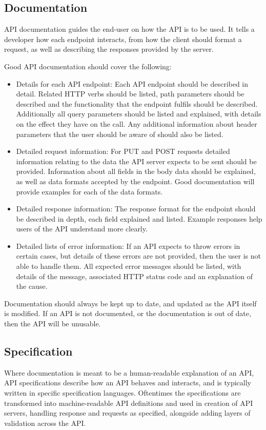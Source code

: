 \subsection{Documentation}
API documentation guides the end-user on how the API is to be used. It tells a developer how each endpoint interacts, from how the client should format a request, as well as describing the responses provided by the server.

Good API documentation should cover the following:
\begin{itemize}
    \item Details for each API endpoint: Each API endpoint should be described in detail. Related HTTP verbs should be listed, path parameters should be described and the functionality that the endpoint fulfils should be described. Additionally all query parameters should be listed and explained, with details on the effect they have on the call. Any additional information about header parameters that the user should be aware of should also be listed.
    \item Detailed request information: For PUT and POST requests detailed information relating to the data the API server expects to be sent should be provided. Information about all fields in the body data should be explained, as well as data formats accepted by the endpoint. Good documentation will provide examples for each of the data formats.
    \item Detailed response information: The response format for the endpoint should be described in depth, each field explained and listed. Example responses help users of the API understand more clearly. 
    \item Detailed lists of error information: If an API expects to throw errors in certain cases, but details of these errors are not provided, then the user is not able to handle them. All expected error messages should be listed, with details of the message, associated HTTP status code and an explanation of the cause. 
\end{itemize}
Documentation should always be kept up to date, and updated as the API itself is modified. If an API is not documented, or the documentation is out of date, then the API will be unusable.

\subsection{Specification}
Where documentation is meant to be a human-readable explanation of an API, API specifications describe how an API behaves and interacts, and is typically written in specific specification languages. Oftentimes the specifications are transformed into machine-readable API definitions and used in creation of API servers, handling response and requests as specified, alongside adding layers of validation across the API.

